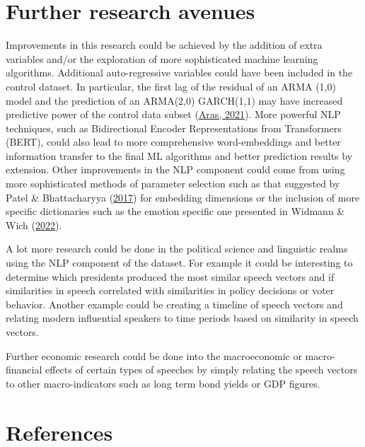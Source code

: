 \documentclass[11pt,preprint, authoryear]{elsarticle}
\numberwithin{equation}{section}
\numberwithin{figure}{section}
\numberwithin{table}{section}
\begin{document}
\hypertarget{further-research-avenues}{%
\section{Further research avenues}\label{further-research-avenues}}

Improvements in this research could be achieved by the addition of extra
variables and/or the exploration of more sophisticated machine learning
algorithms. Additional auto-regressive variables could have been
included in the control dataset. In particular, the first lag of the
residual of an ARMA (1,0) model and the prediction of an ARMA(2,0)
GARCH(1,1) may have increased predictive power of the control data
subset (\protect\hyperlink{ref-aras2021stacking}{Aras, 2021}). More
powerful NLP techniques, such as Bidirectional Encoder Representations
from Transformers (BERT), could also lead to more comprehensive
word-embeddings and better information transfer to the final ML
algorithms and better prediction results by extension. Other
improvements in the NLP component could come from using more
sophisticated methods of parameter selection such as that suggested by
Patel \& Bhattacharyya
(\protect\hyperlink{ref-patel-bhattacharyya-2017-towards}{2017}) for
embedding dimensions or the inclusion of more specific dictionaries such
as the emotion specific one presented in Widmann \& Wich
(\protect\hyperlink{ref-widmann_wich_2022}{2022}).

A lot more research could be done in the political science and
linguistic realms using the NLP component of the dataset. For example it
could be interesting to determine which presidents produced the most
similar speech vectors and if similarities in speech correlated with
similarities in policy decisions or voter behavior. Another example
could be creating a timeline of speech vectors and relating modern
influential speakers to time periods based on similarity in speech
vectors.

Further economic research could be done into the macroeconomic or
macro-financial effects of certain types of speeches by simply relating
the speech vectors to other macro-indicators such as long term bond
yields or GDP figures.

\newpage

\hypertarget{references}{%
\section*{References}\label{references}}
\end{document}
